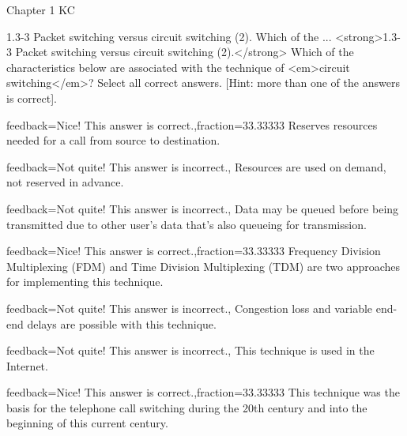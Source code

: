 \documentclass[a4paper]{article}
\begin{document}
\begin{quiz}{Chapter 1 KC}
\begin{multi}[points=1,multiple]{1.3-3 Packet switching versus circuit switching (2).  Which of the ...}
<strong>1.3-3 Packet switching versus circuit switching (2).</strong>  Which of the characteristics below are associated with the technique of <em>circuit switching</em>? Select all correct answers. [Hint: more than one of the answers is correct].
\item[feedback={Nice! This answer is correct.},fraction=33.33333] Reserves resources needed for a call from source to destination.
\item[feedback={Not quite! This answer is incorrect.},] Resources are used on demand, not reserved in advance.
\item[feedback={Not quite! This answer is incorrect.},] Data may be queued before being transmitted due to other user’s data that’s also queueing for transmission.
\item[feedback={Nice! This answer is correct.},fraction=33.33333] Frequency Division Multiplexing (FDM) and Time Division Multiplexing (TDM) are two approaches for implementing this technique.
\item[feedback={Not quite! This answer is incorrect.},] Congestion loss and variable end-end delays are possible with this technique.
\item[feedback={Not quite! This answer is incorrect.},] This technique is used in the Internet.
\item[feedback={Nice! This answer is correct.},fraction=33.33333] This technique was the basis for the telephone call switching during the 20th century and into the beginning of this current century.
\end{multi}


\end{quiz}
\end{document}
